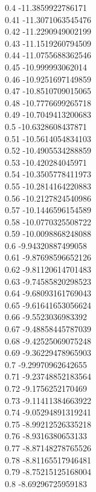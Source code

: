 {0.4	-11.3859922786171\\
0.41	-11.3071063545476\\
0.42	-11.2290949002199\\
0.43	-11.1519260794509\\
0.44	-11.0755688362546\\
0.45	-10.999993062014\\
0.46	-10.9251697149859\\
0.47	-10.8510709015065\\
0.48	-10.7776699265718\\
0.49	-10.7049413200683\\
0.5	-10.6328608437871\\
0.51	-10.5614054834103\\
0.52	-10.4905534288859\\
0.53	-10.420284045971\\
0.54	-10.3505778411973\\
0.55	-10.2814164220883\\
0.56	-10.2127824540986\\
0.57	-10.1446596154589\\
0.58	-10.0770325508722\\
0.59	-10.0098868248088\\
0.6	-9.94320887499058\\
0.61	-9.87698596652126\\
0.62	-9.81120614701483\\
0.63	-9.74585820298523\\
0.64	-9.68093161769043\\
0.65	-9.61641653056624\\
0.66	-9.5523036983392\\
0.67	-9.48858445787039\\
0.68	-9.42525069075248\\
0.69	-9.36229478965903\\
0.7	-9.29970962642655\\
0.71	-9.23748852183564\\
0.72	-9.1756252170469\\
0.73	-9.11411384663922\\
0.74	-9.05294891319241\\
0.75	-8.99212526335218\\
0.76	-8.9316380653133\\
0.77	-8.87148278765526\\
0.78	-8.81165517946481\\
0.79	-8.75215125168004\\
0.8	-8.69296725959183\\
}
